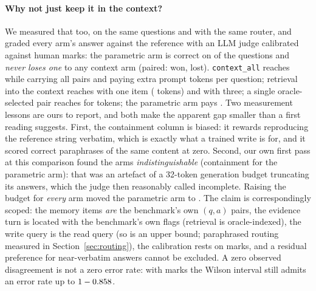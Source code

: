 \documentclass[11pt]{article}
\begin{document}
\paragraph{Why not just keep it in the context?} We measured that too, on the same
questions and with the same router, and graded every arm's answer against the
reference with an LLM judge calibrated against \tJudgeMergedMarks{} human marks: the
parametric arm is correct on \tJudgeWeights{} of the questions and \emph{never loses
one} to any context arm (paired: \tJudgeWins{} won, \tJudgeLosses{} lost).
\texttt{context\_all} reaches \tJudgeContextAll{} while carrying all \tLongMemSubset{} pairs and
paying \tTokContextAll{} extra prompt tokens per question; retrieval into the
context reaches \tJudgeRagOne{} with one item (\tTokRagOne{} tokens) and
\tJudgeRagThree{} with three; a single oracle-selected pair reaches
\tJudgeContextTarget{} for \tTokContextTarget{} tokens; the parametric arm pays
\tTokWeights{}. Two measurement lessons are ours to report, and both make the
apparent gap smaller than a first reading suggests. First, the containment column is
biased: it rewards reproducing the reference string verbatim, which is exactly what
a trained write is for, and it scored correct paraphrases of the same content at
zero. Second, our own first pass at this comparison found the arms
\emph{indistinguishable} (containment \tLongMemOnArchived{} for the parametric arm):
that was an artefact of a 32-token generation budget truncating its answers, which
the judge then reasonably called incomplete. Raising the budget for \emph{every} arm
moved the parametric arm to \tLongMemOn{}. The claim is correspondingly scoped: the
memory items \emph{are} the benchmark's own $(q,a)$ pairs, the evidence turn is
located with the benchmark's own flags (retrieval is oracle-indexed), the write query
is the read query (so \tLongMemRouting{} is an upper bound; paraphrased routing
measured \tRouterAcc{} in Section~\ref{sec:routing}), the calibration rests on
\tJudgeMergedMarks{} marks, and a residual preference for near-verbatim answers cannot
be excluded. A zero observed disagreement is not a zero error rate: with
\tJudgeMergedMarks{} marks the Wilson interval still admits an error rate up to
$1 - 0.858{}$.
\end{document}

